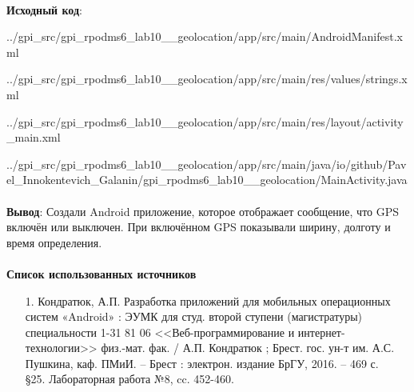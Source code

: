 \documentclass[12pt, a4paper, simple]{eskdtext}
\begin{document}
    \paragraph{} \textbf{Исходный код}: 

    
        {../gpi_src/gpi_rpodms6_lab10__geolocation/app/src/main/AndroidManifest.xml}

    
        {../gpi_src/gpi_rpodms6_lab10__geolocation/app/src/main/res/values/strings.xml}

    
        {../gpi_src/gpi_rpodms6_lab10__geolocation/app/src/main/res/layout/activity_main.xml}

    
        {../gpi_src/gpi_rpodms6_lab10__geolocation/app/src/main/java/io/github/Pavel_Innokentevich_Galanin/gpi_rpodms6_lab10__geolocation/MainActivity.java}

    \paragraph{} \textbf{Вывод}:
    Создали Android приложение, которое отображает сообщение, что GPS включён или выключен.
    При включённом GPS показывали ширину, долготу и время определения.
    \paragraph{} \textbf{Список использованных источников} 
    \begin{enumerate}
        \item[1.] Кондратюк, А.П. Разработка приложений для мобильных операционных систем «Android» :
        ЭУМК для студ. второй ступени (магистратуры) специальности 1-31 81 06 <<Веб-программирование и интернет-технологии>>
        физ.-мат. фак. / А.П. Кондратюк ; Брест. гос. ун-т им. А.С. Пушкина, каф. ПМиИ. – Брест :
        электрон. издание БрГУ, 2016. – 469 с.\\
        §25. Лабораторная работа №8, cc. 452-460.
    \end{enumerate}
    \newpage
\end{document}
